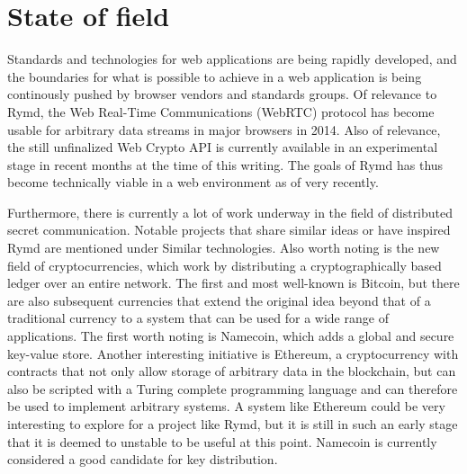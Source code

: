 \section{State of field}
Standards and technologies for web applications are being rapidly developed, and the boundaries for what is possible to achieve in a web application is being continously pushed by browser vendors and standards groups. Of relevance to Rymd, the Web Real-Time Communications (WebRTC) protocol has become usable for arbitrary data streams in major browsers in 2014. Also of relevance, the still unfinalized Web Crypto API is currently available in an experimental stage in recent months at the time of this writing. The goals of Rymd has thus become technically viable in a web environment as of very recently.

Furthermore, there is currently a lot of work underway in the field of distributed secret communication. Notable projects that share similar ideas or have inspired Rymd are mentioned under Similar technologies. Also worth noting is the new field of cryptocurrencies, which work by distributing a cryptographically based ledger over an entire network. The first and most well-known is Bitcoin, but there are also subsequent currencies that extend the original idea beyond that of a traditional currency to a system that can be used for a wide range of applications. The first worth noting is Namecoin, which adds a global and secure key-value store. Another interesting initiative is Ethereum, a cryptocurrency with contracts that not only allow storage of arbitrary data in the blockchain, but can also be scripted with a Turing complete programming language and can therefore be used to implement arbitrary systems. A system like Ethereum could be very interesting to explore for a project like Rymd, but it is still in such an early stage that it is deemed to unstable to be useful at this point. Namecoin is currently considered a good candidate for key distribution.

